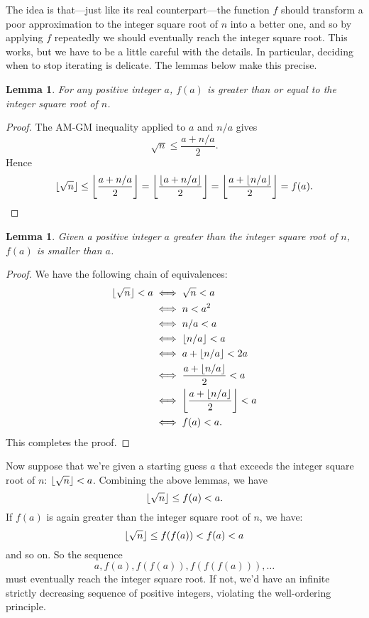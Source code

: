 \documentclass[a4paper]{article}
\DeclarePairedDelimiter\floor{\lfloor}{\rfloor}
\theoremstyle{plain}
\newtheorem{lemma}[theorem]{Lemma}
\theoremstyle{definition}
\begin{document}
The idea is that---just like its real counterpart---the function $f$ should
transform a poor approximation to the integer square root of $n$ into a better
one, and so by applying $f$ repeatedly we should eventually reach the integer
square root. This works, but we have to be a little careful with the details.
In particular, deciding when to stop iterating is delicate. The lemmas below
make this precise.

\begin{lemma}
  \label{heron_high}
  For any positive integer $a$, $f(a)$ is greater than or equal to the
  integer square root of $n$.
\end{lemma}

\begin{proof}
  The AM-GM inequality applied to $a$ and $n/a$ gives
  $$\sqrt n \le \frac{a + n/a}2.$$
  Hence
  $$\floor{\sqrt n} \le \floor*{\frac{a + n/a}2}
  = \floor*{\frac{\floor{a + n/a}}2}
  = \floor*{\frac{a + \floor{n/a}}2} = f(a).$$
\end{proof}

\begin{lemma}
  \label{heron_decreases}
  Given a positive integer $a$ greater than the integer square
  root of $n$, $f(a)$ is smaller than $a$.
\end{lemma}

\begin{proof}
  We have the following chain of equivalences:
  \begin{align*}
    \floor{\sqrt n} < a &\iff \sqrt n < a \\
                        &\iff n < a^2 \\
                        &\iff n/a < a \\
                        &\iff \floor{n/a} < a \\
                        &\iff a + \floor{n/a} < 2a \\
                        &\iff \frac{a + \floor{n/a}}2 < a \\
                        &\iff \floor*{\frac{a + \floor{n/a}}2} < a \\
                        &\iff f(a) < a.
  \end{align*}
  This completes the proof.
\end{proof}

Now suppose that we're given a starting guess $a$ that exceeds the integer
square root of $n$: $\floor{\sqrt n} < a$. Combining the above lemmas,
we have
$$\floor{\sqrt n} \le f(a) < a.$$ If $f(a)$ is again greater than the integer
square root of $n$, we have:
$$\floor{\sqrt n} \le f(f(a)) < f(a) < a$$ and so on. So the sequence
$$a, f(a), f(f(a)), f(f(f(a))), \dots$$
must eventually reach the integer square root. If not, we'd have an infinite
strictly decreasing sequence of positive integers, violating the well-ordering
principle.
\end{document}

